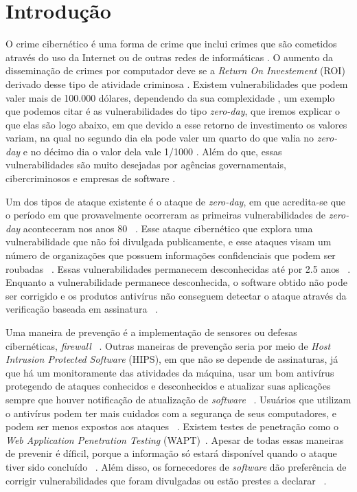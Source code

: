 \section{Introdução}
O crime cibernético é uma forma de crime que inclui crimes que são cometidos através do uso da Internet ou de outras redes de
informáticas \cite{Fotiet:2015}. O aumento da disseminação de crimes por computador deve se a \textit{Return On Investement}
(ROI) derivado desse tipo de atividade criminosa \cite{Fotiet:2015}. Existem vulnerabilidades que podem valer mais de 100.000 dólares, 
dependendo da sua complexidade \cite{Bilge:2012}, um exemplo que podemos citar é as vulnerabilidades do tipo \textit{zero-day}, que 
iremos explicar o que elas são logo abaixo, em que devido a esse retorno de investimento os valores variam, na qual no segundo dia ela 
pode valer um quarto do que valia no \textit{zero-day} e no décimo dia o valor dela vale 1/1000 \cite{Fotiet:2015}. Além do que, essas 
vulnerabilidades são muito desejadas por agências governamentais, cibercriminosos e empresas de software \cite{Kumar:2016}.

Um dos tipos de ataque existente é o ataque de \textit{zero-day}, em que acredita-se que o período em que provavelmente ocorreram as 
primeiras vulnerabilidades de \textit{zero-day} aconteceram nos anos 80 ~\cite{Fotiet:2015}. Esse ataque cibernético que explora uma 
vulnerabilidade que não foi divulgada publicamente, e esse ataques visam um número de organizações que possuem informações confidenciais 
que podem ser roubadas ~\cite{Bilge:2012}. Essas vulnerabilidades permanecem desconhecidas até por 2.5 anos ~\cite{Bilge:2012}. Enquanto 
a vulnerabilidade permanece desconhecida, o software obtido não pode ser corrigido e os produtos antivírus não conseguem detectar o 
ataque através da verificação baseada em assinatura ~\cite{Bilge:2012}. 

Uma maneira de prevenção é a implementação de sensores ou defesas cibernéticas, \textit{firewall} ~\cite{Last:2016}. Outras maneiras de 
prevenção seria por meio de \textit{Host Intrusion Protected Software} (HIPS), em que não se depende de assinaturas, já que há um 
monitoramente das atividades da máquina, usar um bom antivírus protegendo de ataques conhecidos e desconhecidos e atualizar suas 
aplicações sempre que houver notificação de atualização de \textit{software} ~\cite{Kumar:2016}. Usuários que utilizam o antivírus podem 
ter mais cuidados com a segurança de seus computadores, e podem ser menos expostos aos ataques ~\cite{Bilge:2012}. Existem testes de 
penetração como o \textit{Web Application Penetration Testing} (WAPT)~\cite{Kumar:2016}. Apesar de todas essas maneiras de prevenir é 
díficil, porque a informação só estará disponível quando o ataque tiver sido concluído ~\cite{Kumar:2016}. Além disso, os fornecedores 
de \textit{software} dão preferência de corrigir vulnerabilidades que foram divulgadas ou estão prestes a declarar ~\cite{Bilge:2012}.


